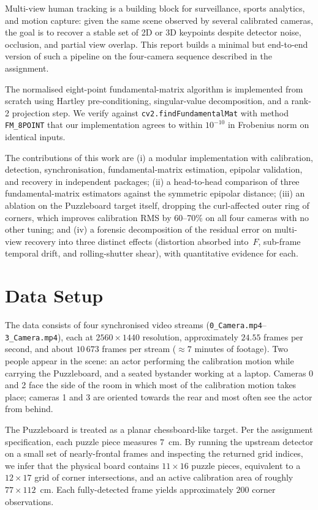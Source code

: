 \documentclass[twocolumn]{article}
\begin{document}
Multi-view human tracking is a building block for surveillance, sports
analytics, and motion capture: given the same scene observed by several
calibrated cameras, the goal is to recover a stable set of 2D or 3D
keypoints despite detector noise, occlusion, and partial view overlap.
This report builds a minimal but end-to-end version of such a
pipeline on the four-camera sequence described in the assignment.

The normalised eight-point fundamental-matrix algorithm is
implemented from scratch using Hartley pre-conditioning, singular-value
decomposition, and a rank-2 projection step. We verify against
\texttt{cv2.findFundamentalMat} with method \texttt{FM\_8POINT} that
our implementation agrees to within $10^{-10}$ in Frobenius norm on
identical inputs.

The contributions of this work are (i) a modular implementation
with calibration, detection, synchronisation, fundamental-matrix
estimation, epipolar validation, and recovery in independent
packages; (ii) a head-to-head comparison of three fundamental-matrix
estimators against the symmetric epipolar distance; (iii) an
ablation on the Puzzleboard target itself, dropping the
curl-affected outer ring of corners, which improves calibration
RMS by 60--70\% on all four cameras with no other tuning; and (iv) a
forensic decomposition of the residual error on multi-view recovery
into three distinct effects (distortion absorbed into~$F$, sub-frame
temporal drift, and rolling-shutter shear), with quantitative evidence
for each.

\section{Data Setup}
\label{sec:data}

The data consists of four synchronised video streams
(\texttt{0\_Camera.mp4}--\texttt{3\_Camera.mp4}), each at
$2560 \times 1440$ resolution, approximately $24.55$ frames per
second, and about $10\,673$ frames per stream ($\approx 7$ minutes of
footage). Two people appear in the scene: an actor performing the
calibration motion while carrying the Puzzleboard, and a seated
bystander working at a laptop. Cameras 0 and 2 face the side of the
room in which most of the calibration motion takes place; cameras 1
and 3 are oriented towards the rear and most often see the actor
from behind.

The Puzzleboard is treated as a planar chessboard-like target. Per
the assignment specification, each puzzle piece measures $7$~cm. By
running the upstream detector on a small set of nearly-frontal frames
and inspecting the returned grid indices, we infer that the physical
board contains $11 \times 16$ puzzle pieces, equivalent to a
$12 \times 17$ grid of corner intersections, and an active calibration
area of roughly $77 \times 112$~cm. Each fully-detected frame yields
approximately $200$ corner observations.
\end{document}
